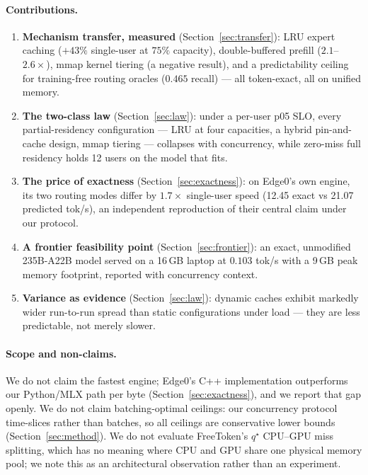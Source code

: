 \documentclass[11pt]{article}
\newcommand{\ppl}{\ensuremath{\times}}
\begin{document}
\paragraph{Contributions.}
\begin{enumerate}[leftmargin=1.7em,itemsep=1pt,topsep=3pt]
  \item \textbf{Mechanism transfer, measured} (Section~\ref{sec:transfer}):
        LRU expert caching ($+43\%$ single-user at $75\%$ capacity),
        double-buffered prefill ($2.1$--$2.6\ppl$), mmap kernel tiering
        (a negative result), and a predictability ceiling for training-free
        routing oracles ($0.465$ recall) --- all token-exact, all on unified
        memory.
  \item \textbf{The two-class law} (Section~\ref{sec:law}): under a per-user
        p05 SLO, every partial-residency configuration --- LRU at four
        capacities, a hybrid pin-and-cache design, mmap tiering ---
        collapses with concurrency, while zero-miss full residency holds 12
        users on the model that fits.
  \item \textbf{The price of exactness} (Section~\ref{sec:exactness}): on
        Edge0's own engine, its two routing modes differ by $1.7\ppl$
        single-user speed (12.45 exact vs 21.07 predicted tok/s), an
        independent reproduction of their central claim under our protocol.
  \item \textbf{A frontier feasibility point}
        (Section~\ref{sec:frontier}): an exact, unmodified 235B-A22B model
        served on a 16\,GB laptop at $0.103$ tok/s with a 9\,GB peak memory
        footprint, reported with concurrency context.
  \item \textbf{Variance as evidence} (Section~\ref{sec:law}): dynamic
        caches exhibit markedly wider run-to-run spread than static
        configurations under load --- they are less predictable, not merely
        slower.
\end{enumerate}

\paragraph{Scope and non-claims.} We do not claim the fastest engine;
Edge0's C++ implementation outperforms our Python/MLX path per byte
(Section~\ref{sec:exactness}), and we report that gap openly. We do not
claim batching-optimal ceilings: our concurrency protocol time-slices rather
than batches, so all ceilings are conservative lower bounds
(Section~\ref{sec:method}). We do not evaluate FreeToken's $q^\star$
CPU--GPU miss splitting, which has no meaning where CPU and GPU share one
physical memory pool; we note this as an architectural observation rather
than an experiment.
\end{document}
